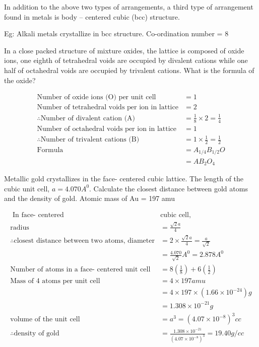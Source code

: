 \begin{note}
	In addition to the above two types of arrangements, a third type of arrangement found in metals is body – centered cubic (bcc) structure. 
\end{note}
Eg: Alkali metals crystallize in bcc structure. Co-ordination number = 8\\
\begin{exercise}
	In a close packed structure of mixture oxides, the lattice is composed of oxide ions, one eighth of tetrahedral voids are occupied by divalent cations while one half of octahedral voids are occupied by trivalent cations. What is the formula of the oxide?
\end{exercise}
\begin{answer}
	$$\begin{aligned}
	\text{Number of oxide ions (O) per unit cell}&= 1\\
	\text{Number of tetrahedral voids per ion in lattice}&= 2\\
	\therefore \text{Number of divalent cation (A)} &= \frac{1}{8} \times 2 = \frac{1}{4}\\
	\text{Number of octahedral voids per ion in lattice}&= 1\\
	\therefore \text{Number of trivalent cations (B)}&= 1 \times \frac{1}{2} = \frac{1}{2}\\
	\text{Formula} &=A_{1/4}B_{1/2}O\\ &= AB_{2}O_{4}
	\end{aligned}$$
\end{answer}
\begin{exercise}
	Metallic gold crystallizes in the face- centered cubic lattice. The length of the cubic unit cell, $a = 4.070 A^{0}$. Calculate the closest distance between gold atoms and the density of gold. Atomic mass of Au = 197 amu
\end{exercise}
\begin{answer}
	\begin{align*}
	\text{	In face- centered }&\text{cubic cell,}\\
	\text{radius} &= \frac{\sqrt{2}a}{4}\\
	\therefore \text{closest distance between two atoms, diameter} &= 2 \times \frac{\sqrt{2}a}{4} = \frac{a}{\sqrt{2}}\\
	&= \frac{4.070}{\sqrt{2}} A^{0} = 2.878 A^{0}\\
	\text{Number of atoms in a face- centered unit cell} &= 8\left( \frac{1}{8}\right) + 6\left( \frac{1}{2}\right)\\
	\text{Mass of 4 atoms per unit cell} &= 4 \times 197 amu\\
	&= 4 \times 197 \times \left( 1.66 \times 10^{-24}\right) g\\
	&= 1.308 \times 10^{-21}g\\
	\text{volume of the unit cell}&= a^{3}= \left( 4.07 \times 10^{-8}\right) ^{3}cc\\
	\therefore \text{density of gold}&= \frac{1.308 \times 10^{-21}}{\left( 4.07 \times 10^{-8}\right) ^{3}} = 19.40 g/cc
	\end{align*}
\end{answer}
